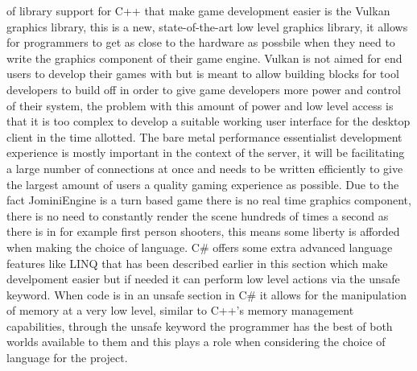 \documentclass{article}
\begin{document}
of library support for C++ that make game development easier is the Vulkan graphics library\cite{vulkan}, this is a new, state-of-the-art low level graphics library, it allows for programmers to get as close to the hardware as possbile when they need to write the graphics component of their game engine. Vulkan is not aimed for end users to develop their games with but is meant to allow building blocks for tool developers to build off in order to give game developers more power and control of their system, the problem with this amount of power and low level access is that it is too complex to develop a suitable working user interface for the desktop client in the time allotted. The bare metal performance essentialist development experience is mostly important in the context of the server, it will be facilitating a large number of connections at once and needs to be written efficiently to give the largest amount of users a quality gaming experience as possible. Due to the fact JominiEngine is a turn based game there is no real time graphics component, there is no need to constantly render the scene hundreds of times a second as there is in for example first person shooters, this means some liberty is afforded when making the choice of language. C\# offers some extra advanced language features like LINQ that has been described earlier in this section which make develpoment easier but if needed it can perform low level actions via the unsafe keyword\cite{unsafe}. When code is in an unsafe section in C\# it allows for the manipulation of memory at a very low level, similar to C++'s memory management capabilities, through the unsafe keyword the programmer has the best of both worlds available to them and this plays a role when considering the choice of language for the project.
\end{document}
